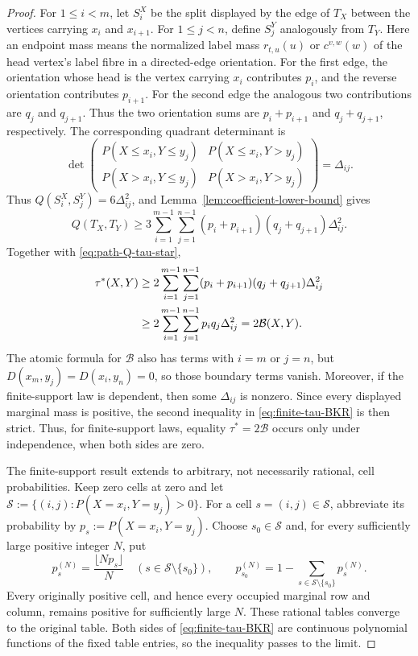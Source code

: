 \documentclass[12pt]{article}
\begin{document}
\begin{proof}
For $1\le i<m$, let $S_i^X$ be the split displayed by the edge of $T_X$
between the vertices carrying $x_i$ and $x_{i+1}$.  For $1\le j<n$, define
$S_j^Y$ analogously from $T_Y$.  Here an endpoint mass means the normalized
label mass $r_{t,u}(u)$ or $c^{v,w}(w)$ of the head vertex's label fibre in a
directed-edge orientation.  For the first edge, the orientation whose head is
the vertex carrying $x_i$ contributes $p_i$, and the reverse orientation
contributes $p_{i+1}$.  For the second edge the analogous two contributions
are $q_j$ and $q_{j+1}$.  Thus the two orientation sums are
$p_i+p_{i+1}$ and $q_j+q_{j+1}$, respectively.  The corresponding quadrant
determinant is
\begin{equation}\label{eq:display-092}
\det\begin{pmatrix}
P(X\le x_i,Y\le y_j)&P(X\le x_i,Y>y_j)\\
P(X>x_i,Y\le y_j)&P(X>x_i,Y>y_j)
\end{pmatrix}=\Delta_{ij}.
\end{equation}
Thus $Q(S_i^X,S_j^Y)=6\Delta_{ij}^2$, and
Lemma~\ref{lem:coefficient-lower-bound} gives
\begin{equation}\label{eq:display-093}
Q(T_X,T_Y)\ge
3\sum_{i=1}^{m-1}\sum_{j=1}^{n-1}
(p_i+p_{i+1})(q_j+q_{j+1})\Delta_{ij}^2.
\end{equation}
Together with \eqref{eq:path-Q-tau-star},
\begin{align}
\tau^*(X,Y)
&\ge2\sum_{i=1}^{m-1}\sum_{j=1}^{n-1}
(p_i+p_{i+1})(q_j+q_{j+1})\Delta_{ij}^2\notag\\
&\ge2\sum_{i=1}^{m-1}\sum_{j=1}^{n-1}p_iq_j\Delta_{ij}^2
=2\mathcal B(X,Y).                                      \label{eq:finite-tau-BKR}
\end{align}
The atomic formula for $\mathcal B$ also has terms with $i=m$ or $j=n$,
but $D(x_m,y_j)=D(x_i,y_n)=0$, so those boundary terms vanish.
Moreover, if the finite-support law is dependent, then some
$\Delta_{ij}$ is nonzero.  Since every displayed marginal mass is positive,
the second inequality in \eqref{eq:finite-tau-BKR} is then strict.  Thus, for
finite-support laws, equality $\tau^*=2\mathcal B$ occurs only under
independence, when both sides are zero.

The finite-support result extends to arbitrary, not necessarily rational,
cell probabilities.  Keep
zero cells at zero and let
$\mathcal S:=\{(i,j):P(X=x_i,Y=y_j)>0\}$.
For a cell $s=(i,j)\in\mathcal S$, abbreviate its probability by
$p_s:=P(X=x_i,Y=y_j)$.  Choose $s_0\in\mathcal S$ and, for every sufficiently
large positive integer $N$, put
\begin{equation}\label{eq:display-094}
p_s^{(N)}=\frac{\lfloor Np_s\rfloor}{N}
\quad(s\in\mathcal S\setminus\{s_0\}),
\qquad
p_{s_0}^{(N)}=1-\sum_{s\in\mathcal S\setminus\{s_0\}}p_s^{(N)}.
\end{equation}
Every originally positive cell, and hence every occupied marginal row
and column, remains positive for sufficiently large $N$.  These rational
tables converge to the original table.  Both sides of
\eqref{eq:finite-tau-BKR} are continuous polynomial functions of the
fixed table entries, so the inequality passes to the limit.


\end{proof}
\end{document}
